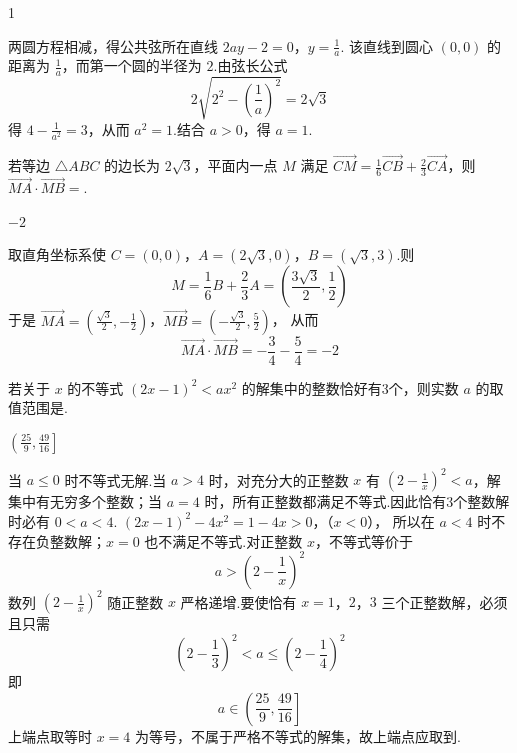 \begin{answer}
1
\end{answer}

\begin{solution}
两圆方程相减，得公共弦所在直线
\(2ay-2=0\)，\(y=\frac1a\).
该直线到圆心 \((0,0)\) 的距离为 \(\frac1a\)，而第一个圆的半径为 \(2\).由弦长公式
\[
2\sqrt{2^2-\left(\frac1a\right)^2}=2\sqrt3
\]
得 \(4-\frac{1}{a^2}=3\)，从而 \(a^2=1\).结合 \(a>0\)，得 \(a=1\).
\end{solution}

\begin{problem}
若等边 \(\triangle ABC\) 的边长为 \(2\sqrt{3}\)，平面内一点 \(M\) 满足 \(\overrightarrow{CM} = \frac{1}{6}\overrightarrow{CB} + \frac{2}{3}\overrightarrow{CA}\)，则 \(\overrightarrow{MA} \cdot \overrightarrow{MB} = \)\fillinblank{}.
\end{problem}

\begin{answer}
\(-2\)
\end{answer}

\begin{solution}
取直角坐标系使 \(C=(0,0)\)，\(A=(2\sqrt3,0)\)，\(B=(\sqrt3,3)\).则
\[
M=\frac16B+\frac23A=\left(\frac{3\sqrt3}{2},\frac12\right)
\]
于是
\(\overrightarrow{MA}=\left(\frac{\sqrt3}{2},-\frac12\right)\)，\(\overrightarrow{MB}=\left(-\frac{\sqrt3}{2},\frac52\right)\)，
从而
\[
\overrightarrow{MA}\cdot\overrightarrow{MB}=-\frac34-\frac54=-2
\]
\end{solution}

\begin{problem}
若关于 \(x\) 的不等式 \((2x - 1)^2 < ax^2\) 的解集中的整数恰好有3个，则实数 \(a\) 的取值范围是\fillinblank{}.
\end{problem}

\begin{answer}
\(\left(\frac{25}{9},\frac{49}{16}\right]\)
\end{answer}

\begin{solution}
当 \(a\leqslant0\) 时不等式无解.当 \(a>4\) 时，对充分大的正整数 \(x\) 有 \((2-\frac{1}{x})^2<a\)，解集中有无穷多个整数；当 \(a=4\) 时，所有正整数都满足不等式.因此恰有3个整数解时必有 \(0<a<4\).
\((2x-1)^2-4x^2=1-4x>0\)，（\(x<0\)），
所以在 \(a<4\) 时不存在负整数解；\(x=0\) 也不满足不等式.对正整数 \(x\)，不等式等价于
\[
a>\left(2-\frac1x\right)^2
\]
数列 \(\left(2-\frac1x\right)^2\) 随正整数 \(x\) 严格递增.要使恰有 \(x=1\)，\(2\)，\(3\) 三个正整数解，必须且只需
\[
\left(2-\frac13\right)^2<a\leqslant\left(2-\frac14\right)^2
\]
即
\[
a\in\left(\frac{25}{9},\frac{49}{16}\right]
\]
上端点取等时 \(x=4\) 为等号，不属于严格不等式的解集，故上端点应取到.
\end{solution}

